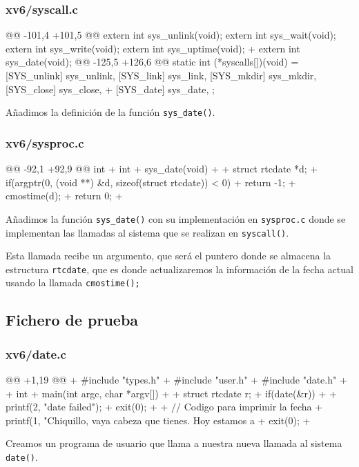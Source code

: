 \subsubsection{xv6/syscall.c}
\begin{listing}
@@ -101,4 +101,5 @@
    extern int sys_unlink(void);
    extern int sys_wait(void);
    extern int sys_write(void);
    extern int sys_uptime(void);
+   extern int sys_date(void);
@@ -125,5 +126,6 @@ static int (*syscalls[])(void) = {
    [SYS_unlink]  sys_unlink,
    [SYS_link]    sys_link,
    [SYS_mkdir]   sys_mkdir,
    [SYS_close]   sys_close,
+   [SYS_date]    sys_date,
    };
\end{listing}
\par Añadimos la definición de la función \texttt{sys\_date()}.

\subsubsection{xv6/sysproc.c}
\begin{listing}
@@ -92,1 +92,9 @@ int
+   int
+   sys_date(void)
+   {
+       struct rtcdate *d;
+       if(argptr(0, (void **) &d, sizeof(struct rtcdate)) < 0)
+           return -1;
+       cmostime(d);
+       return 0;
+   }
\end{listing}
\par Añadimos la función \texttt{sys\_date()} con su implementación en \texttt{sysproc.c}
donde se implementan las llamadas al sistema que se realizan en \texttt{syscall()}.
\par Esta llamada recibe un argumento, que será el puntero donde se almacena
la estructura \texttt{rtcdate}, que es donde actualizaremos la información de la fecha
actual usando la llamada \texttt{cmostime();}
\subsection{Fichero de prueba}
\subsubsection{xv6/date.c}
\begin{listing}
@@ +1,19 @@
+   #include "types.h"
+   #include "user.h"
+   #include "date.h"
+
+   int 
+   main(int argc, char *argv[])
+   {
+       struct rtcdate r;
+       if(date(&r))
+       {
+           printf(2, "date failed\n");
+           exit(0);
+       }
+       // Codigo para imprimir la fecha
+       printf(1, "Chiquillo, vaya cabeza que tienes. Hoy estamos a %
+       exit(0);
+   }
\end{listing}
\par Creamos un programa de usuario que llama a nuestra nueva llamada al sistema \texttt{date()}.


